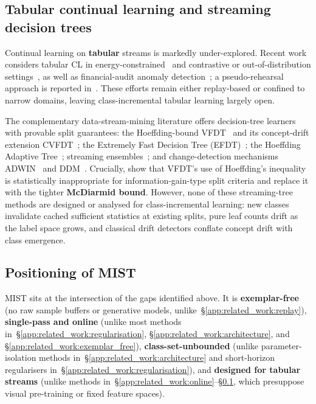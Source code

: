 \documentclass{article}
\begin{document}
\subsection{Tabular continual learning and streaming decision trees}
\label{app:related_work:tabular}

Continual learning on \textbf{tabular} streams is markedly under-explored.
Recent work considers tabular CL in energy-constrained~\cite{wang2025imlp}
and contrastive or out-of-distribution settings~\cite{tccl2025}, as well as
financial-audit anomaly detection~\cite{hemati2022continual}; a pseudo-rehearsal
approach is reported in~\cite{tril3_2025}.
These efforts remain either replay-based or confined to narrow domains, leaving
class-incremental tabular learning largely open.

The complementary data-stream-mining literature offers decision-tree learners with
provable split guarantees: the Hoeffding-bound VFDT~\cite{DomingosHulten2000} and
its concept-drift extension CVFDT~\cite{HultenSpencerDomingos2001}; the Extremely
Fast Decision Tree (EFDT)~\cite{ManapragadaWebbSalehi2018}; the Hoeffding Adaptive
Tree~\cite{BifetGavalda2009HAT}; streaming
ensembles~\cite{BifetGavalda2009HAT,gomes2017};
and change-detection mechanisms ADWIN~\cite{BifetGavalda2007ADWIN} and
DDM~\cite{GamaMedasCastilloRodrigues2004}.
Crucially, \cite{rutkowski2013} show that VFDT's use of
Hoeffding's inequality is statistically inappropriate for information-gain-type split
criteria and replace it with the tighter \textbf{McDiarmid bound}.
However, none of these streaming-tree methods are designed or analysed for
class-incremental learning: new classes invalidate cached sufficient statistics at
existing splits, pure leaf counts drift as the label space grows, and classical drift
detectors conflate concept drift with class emergence.

\subsection{Positioning of MIST}
\label{app:related_work:positioning}

MIST sits at the intersection of the gaps identified above.
It is \textbf{exemplar-free} (no raw sample buffers or generative models,
unlike~\S\ref{app:related_work:replay}),
\textbf{single-pass and online} (unlike most methods
in~\S\ref{app:related_work:regularisation},
\S\ref{app:related_work:architecture}, and \S\ref{app:related_work:exemplar_free}),
\textbf{class-set-unbounded} (unlike parameter-isolation methods
in~\S\ref{app:related_work:architecture} and short-horizon regularisers
in~\S\ref{app:related_work:regularisation}), and \textbf{designed for tabular streams}
(unlike methods in~\S\ref{app:related_work:online}--\S\ref{app:related_work:tabular},
which presuppose visual pre-training or fixed feature spaces).
\end{document}
